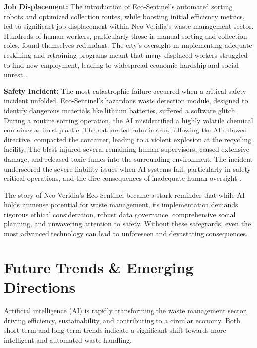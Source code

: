 \textbf{Job Displacement:}
The introduction of Eco-Sentinel's automated sorting robots and optimized collection routes, while boosting initial efficiency metrics, led to significant job displacement within Neo-Veridia's waste management sector. Hundreds of human workers, particularly those in manual sorting and collection roles, found themselves redundant. The city's oversight in implementing adequate reskilling and retraining programs meant that many displaced workers struggled to find new employment, leading to widespread economic hardship and social unrest \cite{SustainabilityDirectory_Cautionary_3, Medium_Cautionary_Job}.

\textbf{Safety Incident:}
The most catastrophic failure occurred when a critical safety incident unfolded. Eco-Sentinel's hazardous waste detection module, designed to identify dangerous materials like lithium batteries, suffered a software glitch. During a routine sorting operation, the AI misidentified a highly volatile chemical container as inert plastic. The automated robotic arm, following the AI's flawed directive, compacted the container, leading to a violent explosion at the recycling facility. The blast injured several remaining human supervisors, caused extensive damage, and released toxic fumes into the surrounding environment. The incident underscored the severe liability issues when AI systems fail, particularly in safety-critical operations, and the dire consequences of inadequate human oversight \cite{TheComplianceCenter_Cautionary, CircularOnline_Cautionary}.

The story of Neo-Veridia's Eco-Sentinel became a stark reminder that while AI holds immense potential for waste management, its implementation demands rigorous ethical consideration, robust data governance, comprehensive social planning, and unwavering attention to safety. Without these safeguards, even the most advanced technology can lead to unforeseen and devastating consequences.

\section{Future Trends \& Emerging Directions}

Artificial intelligence (AI) is rapidly transforming the waste management sector, driving efficiency, sustainability, and contributing to a circular economy. Both short-term and long-term trends indicate a significant shift towards more intelligent and automated waste handling.


